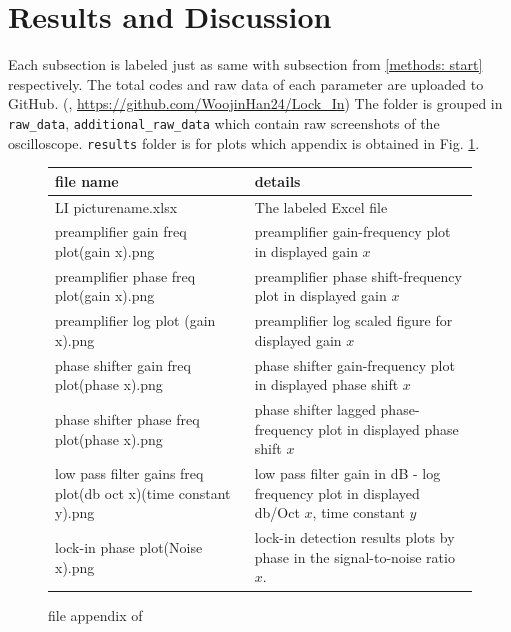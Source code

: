 \documentclass{article}
\begin{document}
\section{Results and Discussion}
\label{results: start}
 Each subsection is labeled just as same with subsection from \ref{methods: start} respectively.
 The total codes and raw data of each parameter are uploaded to GitHub.
 (\cite{github}, \url{https://github.com/WoojinHan24/Lock_In})
 The folder is grouped in \verb|raw_data|, \verb|additional_raw_data| which contain raw screenshots of the oscilloscope.
 \verb|results| folder is for plots which appendix is obtained in Fig. \ref{fig: file_appendix}.

\begin{figure}[H]
    \begin{tabular}{  m{6.2cm} | m{7.7cm} } 

      file name& details \\ 
      \hline
      \hline
        LI picturename.xlsx & The labeled Excel file\\
      \hline
        preamplifier gain freq plot(gain x).png & preamplifier gain-frequency plot in displayed gain $x$\\
      \hline
        preamplifier phase freq plot(gain x).png & preamplifier phase shift-frequency plot in displayed gain $x$\\
      \hline
        preamplifier log plot (gain x).png & preamplifier log scaled figure for displayed gain $x$\\
      \hline
        phase shifter gain freq plot(phase x).png & phase shifter gain-frequency plot in displayed phase shift $x$\\
      \hline
        phase shifter phase freq plot(phase x).png & phase shifter lagged phase-frequency plot in displayed phase shift $x$\\
      \hline
        low pass filter gains freq plot(db oct x)(time constant y).png & low pass filter gain in dB - log frequency plot in displayed db/Oct $x$, time constant $y$\\
      \hline
        lock-in phase plot(Noise x).png & lock-in detection results plots by phase in the signal-to-noise ratio $x$.
    \end{tabular}
    \caption{file appendix of \cite{github}}
    \label{fig: file_appendix}
\end{figure}
\end{document}
